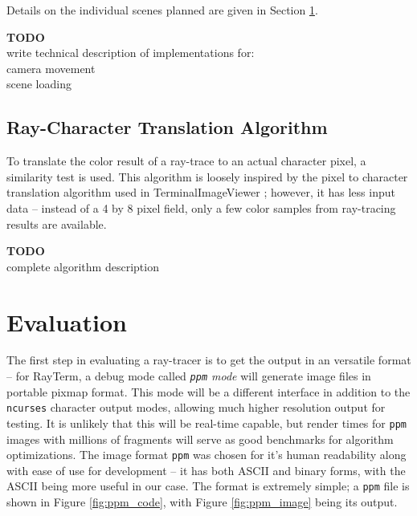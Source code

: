 \documentclass[11pt]{article}
\newcommand{\name}{{\sc RayTerm}}
\newcommand\todo[1]{
\begin{center}
  \color{red}
  {\bf TODO}\\
  #1
\end{center}
}
\begin{document}
Details on the individual scenes planned are given in Section \ref{sec:evaluate}.

\todo{
write technical description of implementations for:\\
camera movement\\
scene loading\\

}

\subsection{Ray-Character Translation Algorithm}
\label{sec:method:ray_character_algorithm}

To translate the color result of a ray-trace to an actual character pixel, a similarity test is used.
This algorithm is loosely inspired by the pixel to character translation algorithm used in TerminalImageViewer \cite{tivGithub}; however, it has less input data -- instead of a 4 by 8 pixel field, only a few color samples from ray-tracing results are available.

\todo{complete algorithm description}

\section{Evaluation}
\label{sec:evaluate}


The first step in evaluating a ray-tracer is to get the output in an versatile format -- for \name, a debug mode called {\it \texttt{ppm} mode} will generate image files in portable pixmap format.
This mode will be a different interface in addition to the \texttt{ncurses} character output modes, allowing much higher resolution output for testing.
It is unlikely that this will be real-time capable, but render times for \texttt{ppm} images with millions of fragments will serve as good benchmarks for algorithm optimizations.
The image format \texttt{ppm} was chosen for it's human readability along with ease of use for development -- it has both ASCII and binary forms, with the ASCII being more useful in our case.
The format is extremely simple; a \texttt{ppm} file is shown in Figure \ref{fig:ppm_code}, with Figure \ref{fig:ppm_image} being its output.
\end{document}
